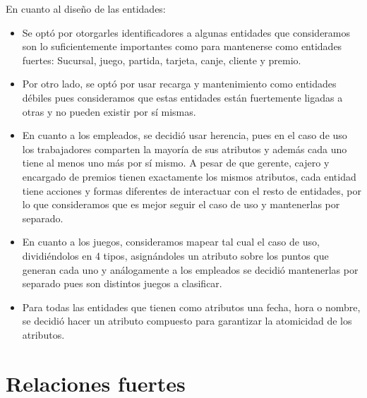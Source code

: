 \documentclass[12pt]{article}
\begin{document}
En cuanto al diseño de las entidades:
\begin{itemize}
    \item Se optó por otorgarles identificadores a algunas entidades que consideramos son lo suficientemente importantes como para mantenerse como entidades fuertes: Sucursal, juego, partida, tarjeta, canje, cliente y premio.
    \item Por otro lado, se optó por usar recarga y mantenimiento como entidades débiles pues consideramos que estas entidades están fuertemente ligadas a otras y no pueden existir por sí mismas.
    \item En cuanto a los empleados, se decidió usar herencia, pues en el caso de uso los trabajadores comparten la mayoría de sus atributos y además cada uno tiene al menos uno más por sí mismo. A pesar de que gerente, cajero y encargado de premios tienen exactamente los mismos atributos, cada entidad tiene acciones y formas diferentes de interactuar con el resto de entidades, por lo que consideramos que es mejor seguir el caso de uso y mantenerlas por separado.
    \item En cuanto a los juegos, consideramos mapear tal cual el caso de uso, dividiéndolos en 4 tipos, asignándoles un atributo sobre los puntos que generan cada uno y análogamente a los empleados se decidió mantenerlas por separado pues son distintos juegos a clasificar.
    \item Para todas las entidades que tienen como atributos una fecha, hora o nombre, se decidió hacer un atributo compuesto para garantizar la atomicidad de los atributos.
\end{itemize}

\newpage
\section*{Relaciones fuertes}
\end{document}
